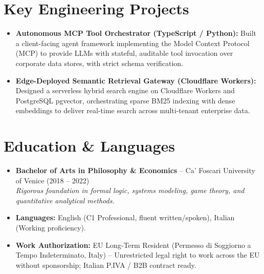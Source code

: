 \documentclass[a4paper,10pt]{article}
\begin{document}
\section{Key Engineering Projects}
\begin{itemize}
  \item \textbf{Autonomous MCP Tool Orchestrator (TypeScript / Python):} Built a client-facing agent framework implementing the Model Context Protocol (MCP) to provide LLMs with stateful, auditable tool invocation over corporate data stores, with strict schema verification.
  \item \textbf{Edge-Deployed Semantic Retrieval Gateway (Cloudflare Workers):} Designed a serverless hybrid search engine on Cloudflare Workers and PostgreSQL pgvector, orchestrating sparse BM25 indexing with dense embeddings to deliver real-time search across multi-tenant enterprise data.
\end{itemize}

\section{Education \& Languages}
\begin{itemize}
  \item \textbf{Bachelor of Arts in Philosophy \& Economics} -- Ca' Foscari University of Venice (2018 -- 2022) \\
  \textit{Rigorous foundation in formal logic, systems modeling, game theory, and quantitative analytical methods.}
  \item \textbf{Languages:} English (C1 Professional, fluent written/spoken), Italian (Working proficiency).
  \item \textbf{Work Authorization:} EU Long-Term Resident (Permesso di Soggiorno a Tempo Indeterminato, Italy) -- Unrestricted legal right to work across the EU without sponsorship; Italian P.IVA / B2B contract ready.
\end{itemize}
\end{document}
